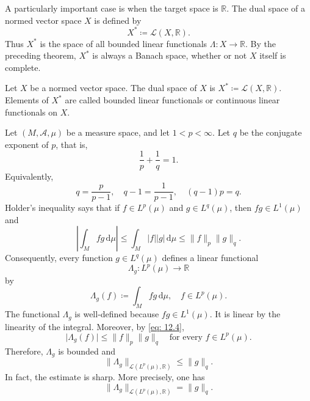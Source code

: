A particularly important case is when the target space is \(\mathbb{R}\). The dual space of a normed vector space \(X\) is defined by 
\[
    X^* \coloneqq \mathcal{L} (X, \mathbb{R}).
\]  
Thus \(X^*\) is the space of all bounded linear functionals \(\Lambda : X \to \mathbb{R}\). By the preceding theorem, \(X^*\) is always a Banach space, whether or not \(X\) itself is complete. 

\begin{definition}
    Let \(X\) be a normed vector space. The dual space of \(X\) is \(X^* \coloneqq \mathcal{L} (X, \mathbb{R})\). Elements of \(X^*\) are called bounded linear functionals or continuous linear functionals on \(X\).     
\end{definition}

\begin{eg}
    Let \((M, \mathcal{A} , \mu )\) be a measure space, and let \(1 < p < \infty\). Let \(q\) be the conjugate exponent of \(p\), that is, 
    \[
        \frac{1}{p} + \frac{1}{q} = 1.
    \]    
    Equivalently,
    \[
        q = \frac{p}{p - 1}, \quad q - 1 = \frac{1}{p - 1}, \quad (q - 1)p = q.
    \]
    Holder's inequality says that if \(f \in L^p (\mu)\) and \(g \in L^q (\mu)\), then \(f g \in L^1 (\mu)\) and 
    \begin{equation} \label{eq: 12.4}
        \left\vert \int _M fg \, \mathrm{d} \mu  \right\vert \le \int _M \vert f \vert \vert g \vert \, \mathrm{d} \mu \le \lVert f \rVert_p \lVert g \rVert_q. 
    \end{equation}  
    Consequently, every function \(g \in L^q (\mu)\) defines a linear functional 
    \[
        \Lambda _g : L^p (\mu) \to \mathbb{R}
    \] 
    by 
    \[
        \Lambda _g (f) \coloneqq \int _M f g \, \mathrm{d} \mu , \quad f \in L^p(\mu ). 
    \]
    The functional \(\Lambda _g\) is well-defined because \(fg \in L^1 (\mu)\). It is linear by the linearity of the integral. Moreover, by \autoref{eq: 12.4}, 
    \[
        \vert \Lambda _g (f) \vert \le \lVert f \rVert_p \lVert g \rVert_q \quad \text{for every } f \in L^p (\mu).
    \]   
    Therefore, \(\Lambda _g\) is bounded and 
    \begin{equation} \label{eq: 12.6}
        \lVert \Lambda _g \rVert_{\mathcal{L} \left( L^p(\mu ), \mathbb{R} \right) } \le \lVert g \rVert_q.
    \end{equation}
    In fact, the estimate is sharp. More precisely, one has 
    \[
       \lVert \Lambda _g \rVert_{\mathcal{L} \left( L^p(\mu ), \mathbb{R} \right) } = \lVert g \rVert_q. 
\]
\end{eg}
